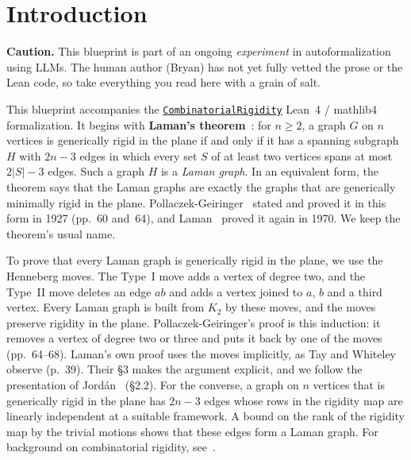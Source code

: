 \section{Introduction}
\label{sec:intro}

\textbf{Caution.} This blueprint is part of an ongoing
\emph{experiment} in autoformalization using LLMs. The human author
(Bryan) has not yet fully vetted the prose or the Lean code, so take
everything you read here with a grain of salt.

This blueprint accompanies the
\href{https://github.com/bryangingechen/CombinatorialRigidity}{\texttt{CombinatorialRigidity}}
Lean~4 / mathlib4 formalization. It begins with \textbf{Laman's
theorem}~\cite{pollaczekGeiringer1927,laman1970}: for $n \ge 2$, a graph
$G$ on $n$ vertices is generically rigid in the plane if and only if it
has a spanning subgraph $H$ with $2n - 3$ edges in which every set $S$
of at least two vertices spans at most $2|S| - 3$ edges. Such a graph
$H$ is a \emph{Laman graph}.
In an equivalent form, the theorem says that the Laman graphs are exactly
the graphs that are generically minimally rigid in the plane.
Pollaczek-Geiringer~\cite{pollaczekGeiringer1927} stated and proved it
in this form in 1927 (pp.~60 and~64), and Laman~\cite{laman1970} proved
it again in 1970. We keep the theorem's usual name.

To prove that every Laman graph is generically rigid in the plane, we use
the Henneberg moves. The Type~I move adds a vertex of degree two, and the
Type~II move deletes an edge $ab$ and adds a vertex joined to $a$, $b$
and a third vertex. Every Laman graph is built from $K_2$ by these moves,
and the moves preserve rigidity in the plane. Pollaczek-Geiringer's
proof is this induction: it removes a vertex of degree two or three and
puts it back by one of the moves (pp.~64--68). Laman's own proof uses the
moves implicitly, as Tay and Whiteley~\cite{tayWhiteley1985} observe
(p.~39). Their \S3 makes the argument explicit, and we follow the
presentation of Jord\'an~\cite{jordan2016} (\S2.2). For the converse, a
graph on $n$ vertices that is generically rigid in the plane has
$2n - 3$ edges whose rows in the rigidity map are linearly independent at
a suitable framework. A bound on the rank of the rigidity map by the
trivial motions shows that these edges form a Laman graph. For background
on combinatorial rigidity, see~\cite{graverServatiusServatius1993,jordan2016}.

